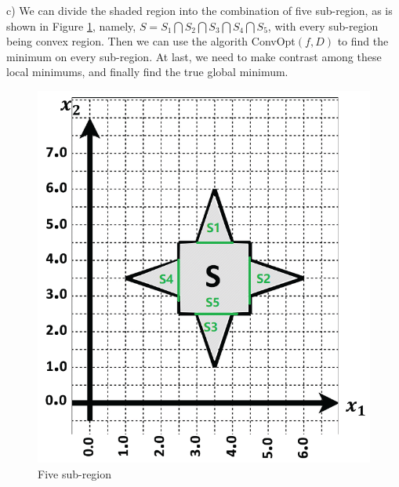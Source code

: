 \documentclass{article}
\begin{document}
c) We can divide the shaded region into the combination of five sub-region, as is shown in Figure \ref{find the minimum}, namely, $S = S_1 \bigcap S_2 \bigcap S_3 \bigcap S_4 \bigcap S_5$, with every sub-region being convex region. Then we can use the algorith ConvOpt$(f, D)$ to find the minimum on every sub-region. At last, we need to make contrast among these local minimums, and finally find the true global minimum.
\begin{figure}
	\centering
	\includegraphics[scale=0.5]{region_distribution.png}
	\caption{Five sub-region}
	\label{find the minimum}
\end{figure}


\small


\end{document}
